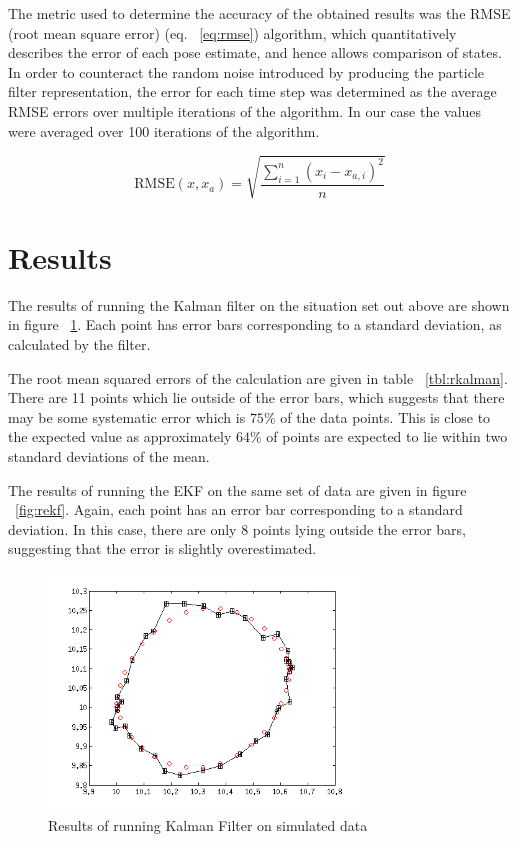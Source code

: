 \documentclass[english]{article}
\begin{document}
The metric used to determine the accuracy of the obtained results was the RMSE (root mean square error) (eq. ~\ref{eq:rmse}) algorithm, which quantitatively describes the error of each pose estimate, and hence allows comparison of states. In order to counteract the random noise introduced by producing the particle filter representation, the error for each time step was determined as the average RMSE errors over multiple iterations of the algorithm. In our case the values were averaged over 100 iterations of the algorithm.

\begin{equation}
\label{eq:rmse}
\mathrm{RMSE}(x, x_a) = \sqrt{\frac{\sum^n_{i=1} \left(x_i - x_{a,i}\right)^2}{n}}
\end{equation}


\section{Results}
The results of running the Kalman filter on the situation set out above are shown in figure ~\ref{fig:rkalman}. Each point has error bars corresponding to a standard deviation, as calculated by the filter.

The root mean squared errors of the calculation are given in table ~\ref{tbl:rkalman}. There are 11 points which lie outside of the error bars, which suggests that there may be some systematic error which is $75\%$ of the data points. This is close to the expected value as approximately $64\%$ of points are expected to lie within two standard deviations of the mean.

The results of running the EKF on the same set of data are given in figure ~\ref{fig:rekf}. Again, each point has an error bar corresponding to a standard deviation. In this case, there are only $8$ points lying outside the error bars, suggesting that the error is slightly overestimated.

\begin{figure}[htp]
\label{fig:rkalman}
\centering
 \includegraphics[width=0.75\textwidth]{images/Kalman.png}
\caption{Results of running Kalman Filter on simulated data}
\end{figure}
\end{document}
